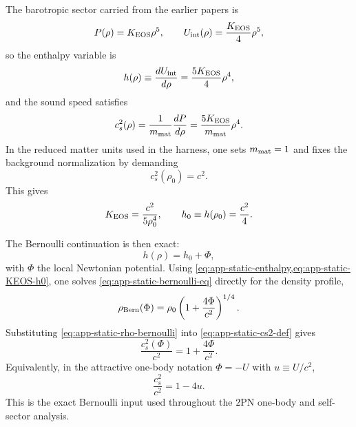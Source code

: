 \documentclass[11pt]{article}
\newcommand{\TwoPN}{\mathrm{2PN}}
\begin{document}
The barotropic sector carried from the earlier papers is
\begin{equation}
P(\rho)=K_{\rm EOS}\rho^5,
\qquad
U_{\rm int}(\rho)=\frac{K_{\rm EOS}}{4}\rho^5,
\label{eq:app-static-eos}
\end{equation}
so the enthalpy variable is
\begin{equation}
h(\rho)\equiv \frac{dU_{\rm int}}{d\rho}=\frac{5K_{\rm EOS}}{4}\rho^4,
\label{eq:app-static-enthalpy}
\end{equation}
and the sound speed satisfies
\begin{equation}
c_s^2(\rho)=\frac{1}{m_{\rm mat}}\frac{dP}{d\rho}
=\frac{5K_{\rm EOS}}{m_{\rm mat}}\rho^4.
\label{eq:app-static-cs2-def}
\end{equation}
In the reduced matter units used in the harness, one sets \(m_{\rm mat}=1\) and fixes the
background normalization by demanding
\begin{equation}
c_s^2(\rho_0)=c^2.
\label{eq:app-static-background-cs}
\end{equation}
This gives
\begin{equation}
K_{\rm EOS}=\frac{c^2}{5\rho_0^4},
\qquad
h_0\equiv h(\rho_0)=\frac{c^2}{4}.
\label{eq:app-static-KEOS-h0}
\end{equation}

The Bernoulli continuation is then exact:
\begin{equation}
h(\rho)=h_0+\Phi,
\label{eq:app-static-bernoulli-eq}
\end{equation}
with \(\Phi\) the local Newtonian potential.
Using \cref{eq:app-static-enthalpy,eq:app-static-KEOS-h0}, one solves
\cref{eq:app-static-bernoulli-eq} directly for the density profile,
\begin{equation}
\rho_{\rm Bern}(\Phi)=\rho_0\left(1+\frac{4\Phi}{c^2}\right)^{1/4}.
\label{eq:app-static-rho-bernoulli}
\end{equation}
Substituting \cref{eq:app-static-rho-bernoulli} into \cref{eq:app-static-cs2-def} gives
\begin{equation}
\frac{c_s^2(\Phi)}{c^2}=1+\frac{4\Phi}{c^2}.
\label{eq:app-static-cs2-phi}
\end{equation}
Equivalently, in the attractive one-body notation \(\Phi=-U\) with
\(u\equiv U/c^2\),
\begin{equation}
\frac{c_s^2}{c^2}=1-4u.
\label{eq:app-static-cs2-u}
\end{equation}
This is the exact Bernoulli input used throughout the \(\TwoPN\) one-body and self-sector
analysis.
\end{document}
